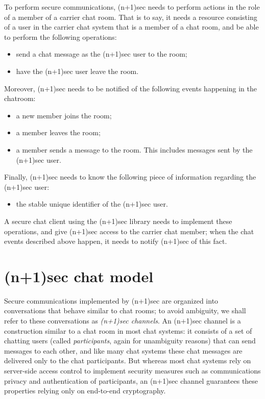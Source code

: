 \documentclass{article}
\begin{document}
To perform secure communications, (n+1)sec needs to perform actions in the role of a member of a carrier chat room.
That is to say, it needs a resource consisting of a user in the carrier chat system that is a member of a chat room, and be able to perform the following operations:
\begin{itemize}
\item send a chat message as the (n+1)sec user to the room;
\item have the (n+1)sec user leave the room.
\end{itemize}
Moreover, (n+1)sec needs to be notified of the following events happening in the chatroom:
\begin{itemize}
\item a new member joins the room;
\item a member leaves the room;
\item a member sends a message to the room. This includes messages sent by the (n+1)sec user.
\end{itemize}
Finally, (n+1)sec needs to know the following piece of information regarding the (n+1)sec user:
\begin{itemize}
\item the stable unique identifier of the (n+1)sec user.
\end{itemize}

A secure chat client using the (n+1)sec library needs to implement these operations, and give (n+1)sec access to the carrier chat member; when the chat events described above happen, it needs to notify (n+1)sec of this fact.

\section{(n+1)sec chat model}
\label{sec:np1sec-chat-model}

Secure communications implemented by (n+1)sec are organized into conversations that behave similar to chat rooms; to avoid ambiguity, we shall refer to these conversations as \emph{(n+1)sec channels}.
An (n+1)sec channel is a construction similar to a chat room in most chat systems: it consists of a set of chatting users (called \emph{participants}, again for unambiguity reasons) that can send messages to each other, and like many chat systems these chat messages are delivered only to the chat participants.
But whereas most chat systems rely on server-side access control to implement security measures such as communications privacy and authentication of participants, an (n+1)sec channel guarantees these properties relying only on end-to-end cryptography.
\end{document}
